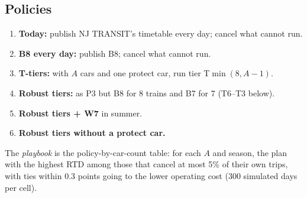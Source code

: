 \documentclass[11pt]{article}
\begin{document}
\subsection{Policies}\label{sec:policies}
\begin{enumerate}[label=P\arabic*.]
\item \textbf{Today:} publish NJ TRANSIT's timetable every day; cancel what cannot run.
\item \textbf{B8 every day:} publish B8; cancel what cannot run.
\item \textbf{T-tiers:} with $A$ cars and one protect car, run tier T$\min(8,A-1)$.
\item \textbf{Robust tiers:} as P3 but B8 for 8 trains and B7 for 7 (T6--T3 below).
\item \textbf{Robust tiers + W7} in summer.
\item \textbf{Robust tiers without a protect car.}
\end{enumerate}
The \emph{playbook} is the policy-by-car-count table: for each $A$ and season, the plan with the highest RTD among those that cancel at most 5\% of their own trips, with ties within 0.3 points going to the lower operating cost (300 simulated days per cell).

\end{document}
